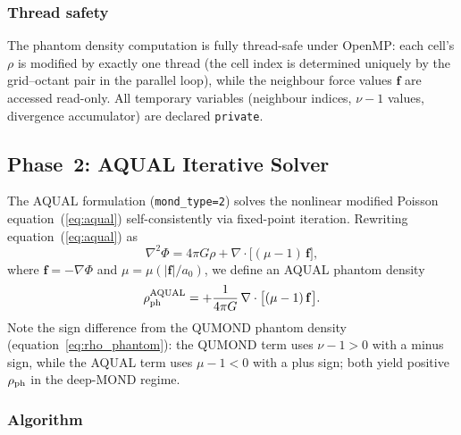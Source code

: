 \documentclass[fleqn,usenatbib]{mnras}
\newcommand{\code}[1]{\texttt{#1}}
\newcommand{\azero}{a_0}
\newcommand{\rhoph}{\rho_{\rm ph}}
\begin{document}
\subsubsection{Thread safety}

The phantom density computation is fully thread-safe under OpenMP:
each cell's $\rho$ is modified by exactly one thread (the cell index
is determined uniquely by the grid--octant pair in the parallel loop),
while the neighbour force values $\mathbf{f}$ are accessed read-only.
All temporary variables (neighbour indices, $\nu-1$ values, divergence
accumulator) are declared \code{private}.

\subsection{Phase~2: AQUAL Iterative Solver}
\label{sec:mond_phase2}

The AQUAL formulation (\code{mond\_type=2}) solves the nonlinear
modified Poisson equation~(\ref{eq:aqual}) self-consistently via
fixed-point iteration.  Rewriting equation~(\ref{eq:aqual}) as
\begin{equation}
\nabla^2 \Phi = 4\pi G\rho + \nabla\cdot\bigl[(\mu - 1)\,\mathbf{f}\bigr],
\label{eq:aqual_split}
\end{equation}
where $\mathbf{f} = -\nabla\Phi$ and $\mu = \mu(|\mathbf{f}|/\azero)$,
we define an AQUAL phantom density
\begin{equation}
\rhoph^{\rm AQUAL} = +\frac{1}{4\pi G}\,\nabla\cdot\bigl[(\mu - 1)
\,\mathbf{f}\bigr].
\label{eq:rho_phantom_aqual}
\end{equation}
Note the sign difference from the QUMOND phantom density
(equation~\ref{eq:rho_phantom}): the QUMOND term uses $\nu - 1 > 0$
with a minus sign, while the AQUAL term uses $\mu - 1 < 0$ with a
plus sign; both yield positive $\rhoph$ in the deep-MOND regime.

\subsubsection{Algorithm}
\end{document}

